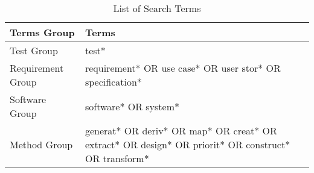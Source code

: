 \begin{table}[!ht]
\caption{List of Search Terms}
\label{table:search_term}
\begin{tabularx}{\textwidth}{lX}
\hline
\textbf{Terms Group} & \textbf{Terms} \\ \hline
Test Group & test* \\
Requirement Group & requirement* OR use case* OR user stor* OR specification* \\
Software Group & software* OR system* \\
Method Group & generat* OR deriv* OR map* OR creat* OR extract* OR design* OR priorit* OR construct* OR transform* \\ \hline
\end{tabularx}
\end{table}